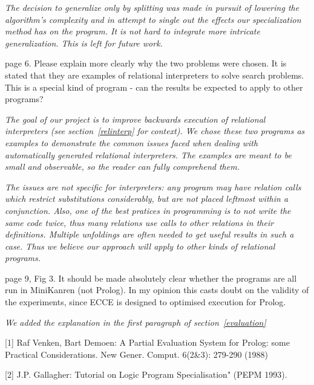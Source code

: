 \emph{The decision to generalize only by splitting was made in pursuit of lowering the algorithm's complexity and in attempt to single out the effects our specialization method has on the program. It is not hard to integrate more intricate generalization. This is left for future work. }

page 6.  Please explain more clearly why the two problems were chosen. It is stated that they are examples of relational interpreters to solve search problems. This is a special kind of program - can the results be expected to apply to other programs?

\emph{The goal of our project is to improve backwards execution of relational interpreters (see section~\ref{relinterp} for context). We chose these two programs as examples to demonstrate the common issues faced when dealing with automatically generated relational interpreters. The examples are meant to be small and observable, so the reader can fully comprehend them.}

\emph{The issues are not specific for interpreters: any program may have relation calls which restrict substitutions considerably, but are not placed leftmost within a conjunction. Also, one of the best pratices in programming is to not write the same code twice, thus many relations use calls to other relations in their definitions. Multiple unfoldings are often needed to get useful results in such a case. Thus we believe our approach will apply to other kinds of relational programs. }

page 9, Fig 3.  It should be made absolutely clear whether the programs are all run in MiniKanren (not Prolog). In my opinion this casts doubt on the validity of the experiments, since ECCE is designed to optimised execution for Prolog.

\emph{We added the explanation in the first paragraph of section~\ref{evaluation}}


[1] Raf Venken, Bart Demoen:
A Partial Evaluation System for Prolog: some Practical Considerations. New Gener. Comput. 6(2\&3): 279-290 (1988)

[2] J.P. Gallagher: Tutorial on Logic Program Specialisation"  (PEPM 1993).